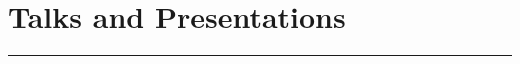 \documentclass[letterpaper]{article}
\begin{document}
\section*{Talks and Presentations}
\vspace{-8pt}
\hrule height .7pt
\smallskip

\end{document}
